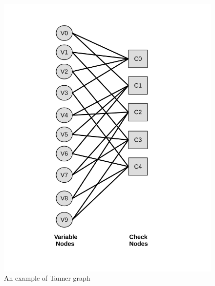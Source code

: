 \documentclass{article}
\begin{document}
\begin{figure}[h]
\begin{centering}
\includegraphics[scale=0.35]{tanner.pdf}
\caption[width=.3\textwidth]{An example of Tanner graph}\label{fig::tanner}
\end{centering}
\end{figure}
\end{document}
